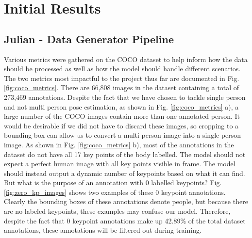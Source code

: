 \documentclass[11pt, letterpaper]{article}
\begin{document}
\section{Initial Results}
\label{SectionInitialResults}

\subsection{Julian - Data Generator Pipeline}

Various metrics were gathered on the COCO dataset to help inform how the data should be processed as well as how the model should handle different scenarios. The two metrics most impactful to the project thus far are documented in Fig. \ref{fig:coco_metrics}. There are 66,808 images in the dataset containing a total of 273,469 annotations. Despite the fact that we have chosen to tackle single person and not multi person pose estimation, as shown in Fig. \ref{fig:coco_metrics} a), a large number of the COCO images contain more than one annotated person. It would be desirable if we did not have to discard these images, so cropping to a bounding box can allow us to convert a multi person image into a single person image. As shown in Fig. \ref{fig:coco_metrics} b), most of the annotations in the dataset do not have all 17 key points of the body labelled. The model should not expect a perfect human image with all key points visible in frame. The model should instead output a dynamic number of keypoints based on what it can find. But what is the purpose of an annotation with 0 labelled keypoints? Fig. \ref{fig:zero_kp_images} shows two examples of these 0 keypoint annotations. Clearly the bounding boxes of these annotations denote people, but because there are no labeled keypoints, these examples may confuse our model. Therefore, despite the fact that 0 keypoint annotations make up 42.89\% of the total dataset annotations, these annotations will be filtered out during training.
\end{document}
